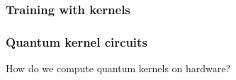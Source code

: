 \documentclass[aspectratio=43]{beamer}
\begin{document}
\begin{frame}
  \frametitle{Training with kernels}

  

\end{frame}


\begin{frame}
  \frametitle{Quantum kernel circuits}

  How do we compute quantum kernels on hardware?

\end{frame}





\begin{frame}[allowframebreaks,t]{\bibname}
	\AtNextBibliography{\footnotesize}%
	\printbibliography
\end{frame}
\end{document}
